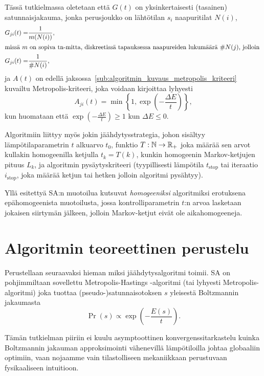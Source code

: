 Tässä tutkielmassa oletetaan että $G(t)$ on yksinkertaisesti (tasainen) satunnaisjakauma, jonka perusjoukko on lähtötilan $s_i$ naapuritilat $N(i)$,
\begin{align}
    G_{ji}(t) =& \frac{1}{m( N( i ) )}, \\
    \intertext{missä $m$ on sopiva tn-mitta, diskreetissä tapauksessa naapureiden lukumäärä $\#N(j)$, jolloin
    }
    G_{ji}(t) =& \frac{1}{\#N( i )},
\end{align}
ja $A(t)$ on edellä jaksossa~\ref{sub:algoritmin_kuvaus_metropolis_kriteeri} kuvailtu Metropolis-kriteeri, joka voidaan kirjoittaa lyhyesti
\begin{equation}
    \label{eq:metropolis_kriteeri}
    A_{ji}(t) = \min\left\{1, \exp\left(-\frac{\Delta E}{t}\right)\right\},
\end{equation}
kun huomataan että $\exp\left(-\frac{\Delta E}{t}\right) \geq 1$ kun $\Delta E \leq 0$.

Algoritmiin liittyy myös jokin jäähdytysstrategia,
johon sisältyy lämpötilaparametrin $t$ alkuarvo $t_0$,
funktio $T: \mathbb{N} \to \mathbb{R}_+$ joka määrää sen arvot kullakin homogeenilla ketjulla $t_{k} = T(k)$,
kunkin homogeenin Markov-ketjujen pituus $L_k$,
ja algoritmin pysäytyskriteeri (tyypillisesti lämpötila $t_\text{stop}$ tai iteraatio $i_\text{stop}$, joka määrää ketjun tai hetken jolloin algoritmi pysähtyy).

Yllä esitettyä SA:n muotoilua \textcite{laarhoven} kutsuvat \emph{homogeeniksi} algoritmiksi erotuksena epähomogeenista muotoilusta,
jossa kontrolliparametrin $t$:n arvoa lasketaan jokaisen siirtymän jälkeen, jolloin Markov-ketjut eivät ole aikahomogeeneja.


\section{Algoritmin teoreettinen perustelu}
\label{sec:algoritmin_teoreettinen_perustelu}

Perustellaan seuraavaksi hieman miksi jäähdytysalgoritmi toimii.
SA on pohjimmiltaan sovellettu Metropolis-Hastings -algoritmi (tai lyhyesti Metropolis-algoritmi) joka tuottaa (pseudo-)satunnaisotoksen $s$ yleisestä Boltzmannin jakaumasta
\begin{equation}
    \Pr\left( s \right) \propto \exp \left(-\frac{E(s)}{t}\right).
    \tag{Boltzmann}
    \label{eq:boltzmann_yleinen}
\end{equation}

Tämän tutkielman piiriin ei kuulu asymptoottinen konvergenssitarkastelu kuinka Boltzmannin jakauman approksimointi vähenevillä lämpötiloilla johtaa globaaliin optimiin,
vaan nojaamme vain tilastolliseen mekaniikkaan perustuvaan fysikaaliseen intuitioon.

